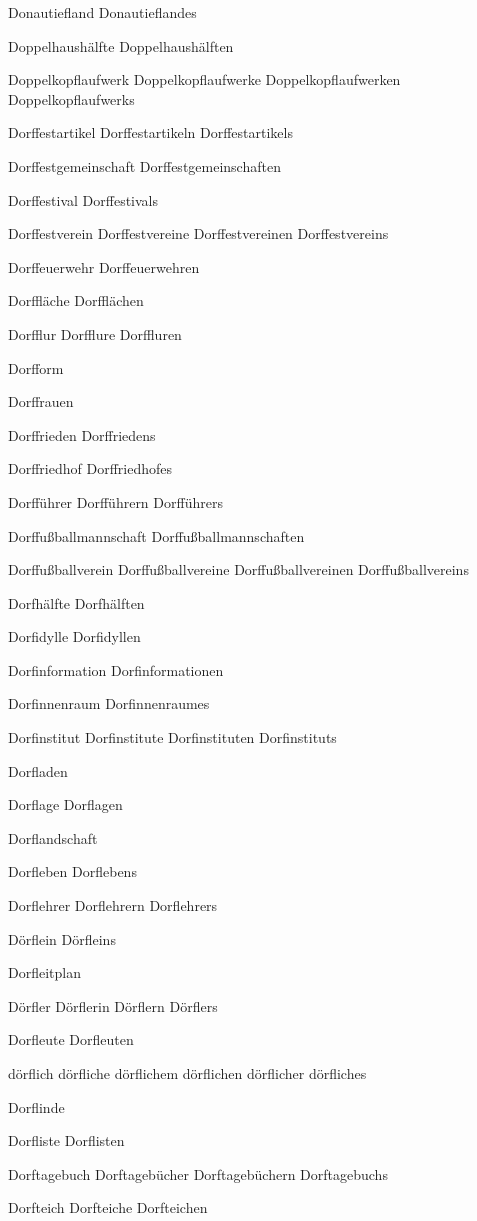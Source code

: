 Donautiefland
Donautieflandes

Doppelhaushälfte
Doppelhaushälften

Doppelkopflaufwerk
Doppelkopflaufwerke
Doppelkopflaufwerken
Doppelkopflaufwerks

Dorffestartikel
Dorffestartikeln
Dorffestartikels

Dorffestgemeinschaft
Dorffestgemeinschaften

Dorffestival
Dorffestivals

Dorffestverein
Dorffestvereine
Dorffestvereinen
Dorffestvereins

Dorffeuerwehr
Dorffeuerwehren

Dorffläche
Dorfflächen

Dorfflur
Dorfflure
Dorffluren

Dorfform

Dorffrauen

Dorffrieden
Dorffriedens

Dorffriedhof
Dorffriedhofes

Dorfführer
Dorfführern
Dorfführers

Dorffußballmannschaft
Dorffußballmannschaften

Dorffußballverein
Dorffußballvereine
Dorffußballvereinen
Dorffußballvereins

Dorfhälfte
Dorfhälften

Dorfidylle
Dorfidyllen

Dorfinformation
Dorfinformationen

Dorfinnenraum
Dorfinnenraumes

Dorfinstitut
Dorfinstitute
Dorfinstituten
Dorfinstituts

Dorfladen

Dorflage
Dorflagen

Dorflandschaft

Dorfleben
Dorflebens

Dorflehrer
Dorflehrern
Dorflehrers

Dörflein
Dörfleins

Dorfleitplan

Dörfler
Dörflerin
Dörflern
Dörflers

Dorfleute
Dorfleuten

dörflich
dörfliche
dörflichem
dörflichen
dörflicher
dörfliches

Dorflinde

Dorfliste
Dorflisten

Dorftagebuch
Dorftagebücher
Dorftagebüchern
Dorftagebuchs

Dorfteich
Dorfteiche
Dorfteichen

